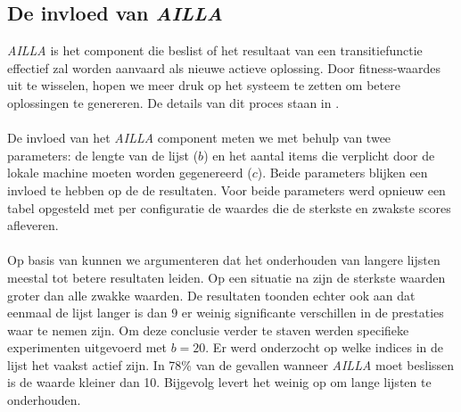 \subsection{De invloed van \emph{AILLA}}

\emph{AILLA} is het component die beslist of het resultaat van een transitiefunctie effectief zal worden aanvaard als nieuwe actieve oplossing. Door fitness-waardes uit te wisselen, hopen we meer druk op het systeem te zetten om betere oplossingen te genereren. De details van dit proces staan in .

\paragraph{}
De invloed van het \emph{AILLA} component meten we met behulp van twee parameters: de lengte van de lijst ($b$) en het aantal items die verplicht door de lokale machine moeten worden gegenereerd ($c$). Beide parameters blijken een invloed te hebben op de de resultaten. Voor beide parameters werd opnieuw een tabel opgesteld met per configuratie de waardes die de sterkste en zwakste scores afleveren.

\paragraph{}
Op basis van  kunnen we argumenteren dat het onderhouden van langere lijsten meestal tot betere resultaten leiden. Op een situatie na zijn de sterkste waarden groter dan alle zwakke waarden. De resultaten toonden echter ook aan dat eenmaal de lijst langer is dan $9$ er weinig significante verschillen in de prestaties waar te nemen zijn. Om deze conclusie verder te staven werden specifieke experimenten uitgevoerd met $b=20$. Er werd onderzocht op welke indices in de lijst het vaakst actief zijn. In 78\% van de gevallen wanneer \emph{AILLA} moet beslissen is de waarde kleiner dan 10. Bijgevolg levert het weinig op om lange lijsten te onderhouden.

